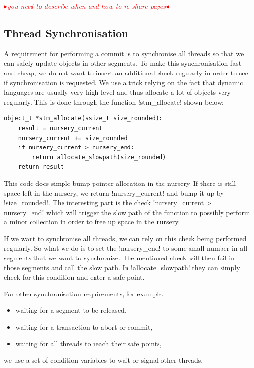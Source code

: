 \documentclass{sigplanconf}
\makeatletter
\renewcommand\lstinline[1][]{%
  \Collectverb{\@@myverb}%
}
\def\@@myverb#1{%
    \begingroup
    \fboxsep=0.2em
    \colorbox{verylightgray}{\oldlstinline|#1|}%
    \endgroup
}
\newcommand{\mynote}[2]{%
  \textcolor{red}{%
    \fbox{\bfseries\sffamily\scriptsize#1}%
    {\small$\blacktriangleright$\textsf{\emph{#2}}$\blacktriangleleft$}%
  }%
}
\newcommand\cfbolz[1]{\mynote{cfbolz}{#1}}
\makeatother
\begin{document}
\cfbolz{you need to describe when and how to re-share pages}


\subsection{Thread Synchronisation}

A requirement for performing a commit is to synchronise all threads so
that we can safely update objects in other segments. To make this
synchronisation fast and cheap, we do not want to insert an additional
check regularly in order to see if synchronisation is requested. We
use a trick relying on the fact that dynamic languages are usually
very high-level and thus allocate a lot of objects very regularly.
This is done through the function \lstinline!stm_allocate!  shown
below:

\begin{lstlisting}
object_t *stm_allocate(ssize_t size_rounded):
    result = nursery_current
	nursery_current += size_rounded
	if nursery_current > nursery_end:
		return allocate_slowpath(size_rounded)
	return result
\end{lstlisting}


This code does simple bump-pointer allocation in the nursery. If there
is still space left in the nursery, we return
\lstinline!nursery_current!  and bump it up by
\lstinline!size_rounded!.  The interesting part is the check
\lstinline!nursery_current > nursery_end!  which will trigger the slow
path of the function to possibly perform a minor collection in order
to free up space in the nursery.

If we want to synchronise all threads, we can rely on this check being
performed regularly. So what we do is to set the
\lstinline!nursery_end!  to some small number in all segments that we
want to synchronise. The mentioned check will then fail in those
segments and call the slow path. In \lstinline!allocate_slowpath!
they can simply check for this condition and enter a safe point.

For other synchronisation requirements, for example:
\begin{itemize}[noitemsep]
\item waiting for a segment to be released,
\item waiting for a transaction to abort or commit,
\item waiting for all threads to reach their safe points,
\end{itemize}
we use a set of condition variables to wait or signal other threads.
\end{document}
